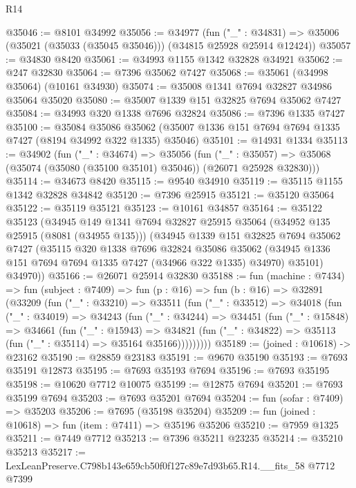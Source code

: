 \begin{lexlean}{R14}
\begin{coremodule}
@35046 := @8101 @34992
@35056 := @34977
    (fun ("_" : @34831) => @35006 (@35021 (@35033 (@35045 @35046))) (@34815 @25928 @25914 @12424))
@35057 := @34830 @8420
@35061 := @34993 @1155 @1342 @32828 @34921
@35062 := @247 @32830
@35064 := @7396 @35062 @7427
@35068 := @35061 (@34998 @35064) (@10161 @34930)
@35074 := @35008 @1341 @7694 @32827 @34986 @35064 @35020
@35080 := @35007 @1339 @151 @32825 @7694 @35062 @7427
@35084 := @34993 @320 @1338 @7696 @32824
@35086 := @7396 @1335 @7427
@35100 := @35084
    @35086
    @35062
    (@35007 @1336 @151 @7694 @7694 @1335 @7427 (@8194 @34992 @322 @1335) @35046)
@35101 := @14931 @1334
@35113 := @34902
    (fun ("_" : @34674) =>
    @35056
      (fun ("_" : @35057) =>
      @35068 (@35074 (@35080 (@35100 @35101) @35046)) (@26071 @25928 @32830)))
@35114 := @34673 @8420
@35115 := @9540 @34910
@35119 := @35115 @1155 @1342 @32828 @34842
@35120 := @7396 @25915
@35121 := @35120 @35064
@35122 := @35119 @35121
@35123 := @10161 @34857
@35164 := @35122
    @35123
    (@34945
      @149
      @1341
      @7694
      @32827
      @25915
      @35064
      (@34952 @135 @25915 (@8081 (@34955 @135)))
      (@34945
        @1339
        @151
        @32825
        @7694
        @35062
        @7427
        (@35115
          @320
          @1338
          @7696
          @32824
          @35086
          @35062
          (@34945 @1336 @151 @7694 @7694 @1335 @7427 (@34966 @322 @1335) @34970)
          @35101)
        @34970))
@35166 := @26071 @25914 @32830
@35188 := fun (machine : @7434) =>
  fun (subject : @7409) =>
  fun (p : @16) =>
  fun (b : @16) =>
  @32891
    (@33209
      (fun ("_" : @33210) =>
      @33511
        (fun ("_" : @33512) =>
        @34018
          (fun ("_" : @34019) =>
          @34243
            (fun ("_" : @34244) =>
            @34451
              (fun ("_" : @15848) =>
              @34661
                (fun ("_" : @15943) =>
                @34821 (fun ("_" : @34822) => @35113 (fun ("_" : @35114) => @35164 @35166)))))))))
@35189 := (joined : @10618) -> @23162
@35190 := @28859 @23183
@35191 := @9670 @35190
@35193 := @7693 @35191 @12873
@35195 := @7693 @35193 @7694
@35196 := @7693 @35195
@35198 := @10620 @7712 @10075
@35199 := @12875 @7694
@35201 := @7693 @35199 @7694
@35203 := @7693 @35201 @7694
@35204 := fun (sofar : @7409) => @35203
@35206 := @7695 (@35198 @35204)
@35209 := fun (joined : @10618) => fun (item : @7411) => @35196 @35206
@35210 := @7959 @1325
@35211 := @7449 @7712
@35213 := @7396 @35211 @23235
@35214 := @35210 @35213
@35217 := LexLeanPreserve.C798b143e659cb50f0f127c89e7d93b65.R14.__fits_58 @7712 @7399

\end{coremodule}
\end{lexlean}
